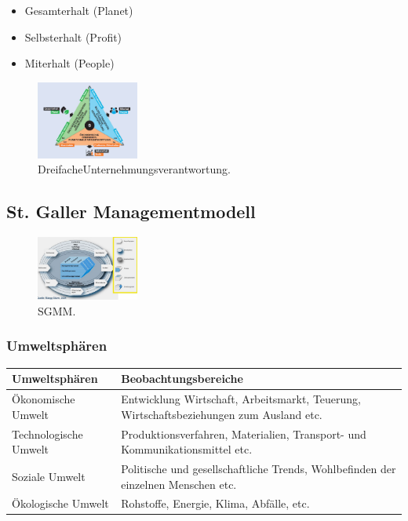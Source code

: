 \documentclass[../ZF_Wing.tex]{subfiles}
\begin{document}
\begin{itemize}
\item Gesamterhalt (Planet)
\item Selbsterhalt (Profit)
\item Miterhalt (People)
\end{itemize}

\begin{figure}[H]
\centering
\includegraphics[width=0.3\textwidth]{Resources/Image/Dreifache Unternehmungsveratntwortung.png}
\caption{\label{fig:DreifacheUnternehmungsverantwortung}DreifacheUnternehmungsverantwortung.}
\end{figure}


\subsection{St. Galler Managementmodell}
\begin{figure}[H]
\centering
\includegraphics[width=0.3\textwidth]{Resources/Image/SGMM.png}
\caption{\label{fig:SGMM}SGMM.}
\end{figure}


\subsubsection{Umweltsphären}

\begin{tabular}{|l|l|}
\hline 
\rule[-1ex]{0pt}{2.5ex} \textbf{Umweltsphären} & \textbf{Beobachtungsbereiche} \\ 
\hline 
\rule[-1ex]{0pt}{2.5ex} Ökonomische Umwelt & Entwicklung Wirtschaft, Arbeitsmarkt, Teuerung, Wirtschaftsbeziehungen zum Ausland etc. \\ 
\hline 
\rule[-1ex]{0pt}{2.5ex} Technologische Umwelt & Produktionsverfahren, Materialien, Transport- und Kommunikationsmittel etc. \\ 
\hline 
\rule[-1ex]{0pt}{2.5ex} Soziale Umwelt & Politische und gesellschaftliche Trends, Wohlbefinden der einzelnen Menschen etc. \\ 
\hline 
\rule[-1ex]{0pt}{2.5ex} Ökologische Umwelt & Rohstoffe, Energie, Klima, Abfälle, etc. \\ 
\hline 
\end{tabular} 
\end{document}
